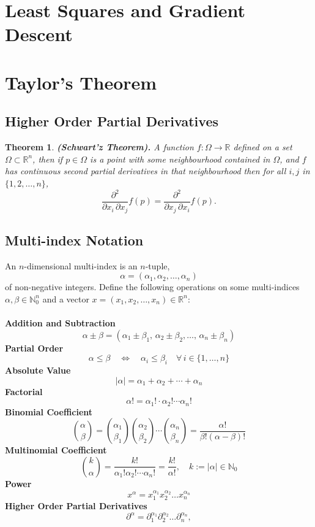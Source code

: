 \documentclass[11pt,a4paper]{article}
\theoremstyle{definition}
\theoremstyle{plain}
\newtheorem{theorem}{Theorem}[section]
\newcommand{\N}{\mathbb{N}}
\newcommand{\R}{\mathbb{R}}
\renewcommand{\tt}[1]{\textnormal{\textbf{(#1).}}} %
\begin{document}
	\newpage
	
	\section{Least Squares and Gradient Descent}
	
	\newpage
	
	\section{Taylor's Theorem}
	\subsection{Higher Order Partial Derivatives}
	\begin{theorem}
		\tt{Schwart'z Theorem}
		A function $f \colon \Omega \to \R$ defined
		on a set $\Omega \subset \R^n$, then if $p \in \Omega$ is a point
		with some neighbourhood contained in $\Omega$, and $f$ has continuous
		second partial derivatives in that neighbourhood then for all $i,j$
		in $\{1,2,\dots,n\}$,
		\[
			{\frac {\partial ^{2}}{\partial x_{i}\,
			\partial x_{j}}}f({p})={\frac {\partial ^{2}}{\partial x_{j}\,
			\partial x_{i}}}f({p}).
		\]
	\end{theorem}
	
	\subsection{Multi-index Notation}
	An $n$-dimensional multi-index is an $n$-tuple,
	\[
		\alpha =(\alpha _{1},\alpha _{2},\ldots ,\alpha _{n})
	\]
	of non-negative integers. Define the following operations on some
	multi-indices $\alpha ,\beta \in \N_{0}^{n}$ and a vector
	$x=(x_{1},x_{2},\ldots ,x_{n})\in \mathbb {R} ^{n}$: \\\\
	\textbf{Addition and Subtraction}
	\[
		\alpha \pm \beta =
		(\alpha _{1}\pm \beta _{1},\,\alpha _{2}\pm 
		\beta _{2},\ldots ,\,\alpha _{n}\pm \beta _{n})
	\]
	\textbf{Partial Order}
	\[
		\alpha \leq \beta \quad \Leftrightarrow \quad 
		\alpha _{i}\leq \beta _{i}\quad \forall \,i\in \{1,\ldots ,n\}
	\]
	\textbf{Absolute Value}
	\[
		|\alpha |=\alpha _{1}+\alpha _{2}+\cdots +\alpha _{n}
	\]
	\textbf{Factorial}
	\[
		\alpha !=\alpha _{1}!\cdot \alpha _{2}!\cdots \alpha _{n}!
	\]
	\textbf{Binomial Coefficient}
	\[
		{\binom {\alpha}{\beta}} = 
		{\binom {\alpha_{1}}{\beta_{1}}}
		{\binom {\alpha_{2}}{\beta_{2}}}\cdots 
		{\binom {\alpha_{n}}{\beta_{n}}} = 
		{\frac {\alpha!}{\beta! (\alpha-\beta)!}}
	\]
	\textbf{Multinomial Coefficient}
	\[
		{\binom {k}{\alpha}} = 
		{\frac {k!}{\alpha_{1}!\alpha_{2}! \cdots \alpha_{n}!}} = 
		{\frac {k!}{\alpha!}}, 
		\quad k:=|\alpha |\in \mathbb {N}_{0}
	\]
	\textbf{Power}
	\[
		x^{\alpha} = 
		x_{1}^{\alpha_{1}}x_{2}^{\alpha_{2}}\ldots x_{n}^{\alpha_{n}}
	\]
	\textbf{Higher Order Partial Derivatives}
	\[
		\partial^{\alpha} = 
		\partial_{1}^{\alpha _{1}}
		\partial _{2}^{\alpha _{2}} \ldots 
		\partial _{n}^{\alpha _{n}},
	\]
\end{document}
